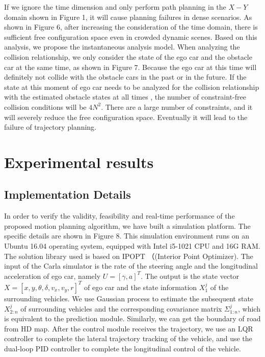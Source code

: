 \documentclass[conference]{IEEEtran}
\begin{document}
If we ignore the time dimension and only perform path planning in the $X-Y$ domain shown in Figure 1, it will cause planning failures in dense scenarios. As shown in Figure 6, after increasing the consideration of the time domain, there is sufficient free configuration space even in crowded dynamic scenes. Based on this analysis, we propose the instantaneous analysis model. When analyzing the collision relationship, we only consider the state of the ego car and the obstacle car at the same time, as shown in Figure 7. Because the ego car at this time will definitely not collide with the obstacle cars in the past or in the future.
If the state at this moment of ego car needs to be analyzed for the collision relationship with the estimated obstacle states at all times , the number of constraint-free collision conditions will be $4N^2$. 
There are a large number of constraints, and it will severely reduce the free configuration space. Eventually it will lead to the failure of trajectory planning. 


\section{ Experimental results }



\subsection{ Implementation Details }
In order to verify the validity, feasibility and real-time performance of the proposed motion planning algorithm, we have built a simulation platform. The specific details are shown in Figure 8. This simulation environment runs on an Ubuntu 16.04 operating system, equipped with Intel i5-1021 CPU and 16G RAM. The solution library used is based on IPOPT （(Interior Point Optimizer). The input of  the Carla simulator is the rate of the steering angle and the longitudinal acceleration of ego car, namely $U=\left[ \gamma ,a \right] ^T$. The output is the state vector $X=\left[x,y,\theta ,\delta,v_x,v_y,r \right] ^T$ of ego car and the state information $X_{1}^{j}$ of the surrounding vehicles. We use Gaussian process to estimate the subsequent state $X_{2:n}^{j}$ of surrounding vehicles and the corresponding covariance matrix $\varSigma _{1:n}^{j}$, which is equivalent to the prediction module. Similarly, we can get the boundary of road from HD map. After the control module receives the trajectory, we use an LQR controller to complete the lateral trajectory tracking of the vehicle, and use the dual-loop PID controller to complete the longitudinal control of the vehicle.
\end{document}
